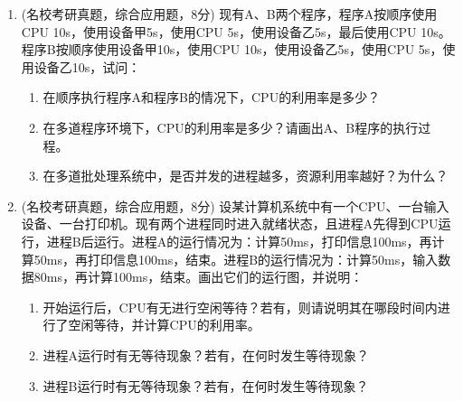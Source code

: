 \documentclass[lang=cn,newtx,10pt,scheme=chinese]{../../elegantbook}
\begin{document}
\begin{enumerate}
    \item (名校考研真题，综合应用题，8分) 现有A、B两个程序，程序A按顺序使用CPU 10s，使用设备甲5s，使用CPU 5s，使用设备乙5s，最后使用CPU 10s。程序B按顺序使用设备甲10s，使用CPU 10s，使用设备乙5s，使用CPU 5s，使用设备乙10s，试问：
    \begin{enumerate}
        \item 在顺序执行程序A和程序B的情况下，CPU的利用率是多少？
        \item 在多道程序环境下，CPU的利用率是多少？请画出A、B程序的执行过程。
        \item 在多道批处理系统中，是否并发的进程越多，资源利用率越好？为什么？
    \end{enumerate}

    \item (名校考研真题，综合应用题，8分) 设某计算机系统中有一个CPU、一台输入设备、一台打印机。现有两个进程同时进入就绪状态，且进程A先得到CPU运行，进程B后运行。进程A的运行情况为：计算50ms，打印信息100ms，再计算50ms，再打印信息100ms，结束。进程B的运行情况为：计算50ms，输入数据80ms，再计算100ms，结束。画出它们的运行图，并说明：
    \begin{enumerate}
        \item 开始运行后，CPU有无进行空闲等待？若有，则请说明其在哪段时间内进行了空闲等待，并计算CPU的利用率。
        \item 进程A运行时有无等待现象？若有，在何时发生等待现象？
        \item 进程B运行时有无等待现象？若有，在何时发生等待现象？
    \end{enumerate}
\end{enumerate}
\end{document}
